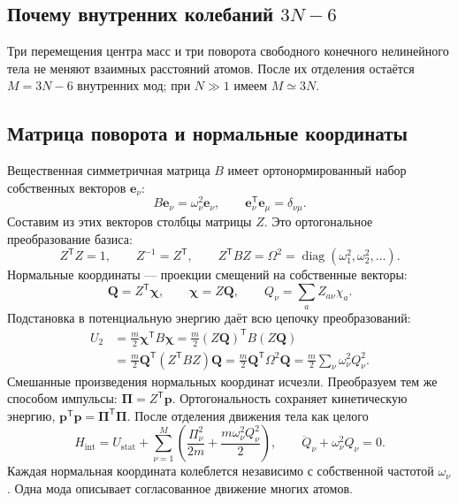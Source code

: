 \documentclass[../final.tex]{subfiles}
\begin{document}
\clearpage
\subsection{Почему внутренних колебаний $3N-6$}
Три перемещения центра масс и три поворота свободного конечного нелинейного тела
не меняют взаимных расстояний атомов. После их отделения остаётся
$M=3N-6$ внутренних мод; при $N\gg1$ имеем $M\simeq3N$.

\subsection{Матрица поворота и нормальные координаты}
Вещественная симметричная матрица $B$ имеет ортонормированный набор
собственных векторов $\mathbf e_\nu$:
\begin{equation*}
 B\mathbf e_\nu=\omega_\nu^2\mathbf e_\nu,\qquad
 \mathbf e_\nu^{\mathsf T}\mathbf e_\mu=\delta_{\nu\mu}.
\end{equation*}
Составим из этих векторов столбцы матрицы $Z$.
Это ортогональное преобразование базиса:
\begin{equation*}
 Z^{\mathsf T}Z=1,\qquad Z^{-1}=Z^{\mathsf T},\qquad
 Z^{\mathsf T}BZ=\Omega^2
 =\operatorname{diag}(\omega_1^2,\omega_2^2,\ldots).
\end{equation*}
Нормальные координаты --- проекции смещений на собственные векторы:
\begin{equation*}
 \mathbf Q=Z^{\mathsf T}\boldsymbol\chi,\qquad
 \boldsymbol\chi=Z\mathbf Q,\qquad
 Q_\nu=\sum_a Z_{a\nu}\chi_a.
\end{equation*}
Подстановка в потенциальную энергию даёт всю цепочку преобразований:
\begin{align*}
 U_2&=\frac m2\boldsymbol\chi^{\mathsf T}B\boldsymbol\chi
 =\frac m2(Z\mathbf Q)^{\mathsf T}B(Z\mathbf Q)\\
 &=\frac m2\mathbf Q^{\mathsf T}(Z^{\mathsf T}BZ)\mathbf Q
 =\frac m2\mathbf Q^{\mathsf T}\Omega^2\mathbf Q
 =\frac m2\sum_\nu\omega_\nu^2Q_\nu^2.
\end{align*}
Смешанные произведения нормальных координат исчезли.
Преобразуем тем же способом импульсы: $\boldsymbol\Pi=Z^{\mathsf T}\mathbf p$.
Ортогональность сохраняет кинетическую энергию,
$\mathbf p^{\mathsf T}\mathbf p=\boldsymbol\Pi^{\mathsf T}\boldsymbol\Pi$.
После отделения движения тела как целого
\begin{equation*}
 H_{\mathrm{int}}=U_{\mathrm{stat}}+\sum_{\nu=1}^{M}
 \left(\frac{\Pi_\nu^2}{2m}+\frac{m\omega_\nu^2Q_\nu^2}{2}\right),\qquad
 \ddot Q_\nu+\omega_\nu^2Q_\nu=0.
\end{equation*}
Каждая нормальная координата колеблется независимо с собственной частотой
$\omega_\nu$. Одна мода описывает согласованное движение многих атомов.
\end{document}
